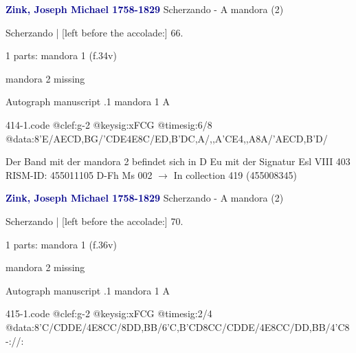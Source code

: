 \documentclass[twocolumn]{book}
\begin{document}
\newline \par \vspace{7pt} \textcolor{darkblue}{\textbf{Zink, Joseph Michael  1758-1829}}
\newline Scherzando - A
\newline mandora (2)
\newline \begin{itshape}[f.34v, at left:] Scherzando | [left before the accolade:] 66.\end{itshape} 
\newline \textcolor{darkblue}{}  1 parts: mandora 1  (f.34v)
\newline \begin{small} mandora 2 missing\end{small} 
\newline Autograph manuscript
.1  mandora 1  A  
\begin{filecontents*}{414-1.code}
@clef:g-2
@keysig:xFCG
@timesig:6/8
@data:8'E/AECD,BG/'CDE4E8C/ED,B'DC,A/,,A'CE4,,A8A/'AECD,B'D/
\end{filecontents*}
\newline
%

\newline Der Band mit der mandora 2 befindet sich in D Eu mit der Signatur Esl VIII 403
\newline RISM-ID: 455011105
\newline D-Fh  Ms 002
\newline $\rightarrow$ In collection 419 (455008345)
      
\newline \par \vspace{7pt} \textcolor{darkblue}{\textbf{Zink, Joseph Michael  1758-1829}}
\newline Scherzando - A
\newline mandora (2)
\newline \begin{itshape}[f.36v, at left:] Scherzando | [left before the accolade:] 70.\end{itshape} 
\newline \textcolor{darkblue}{}  1 parts: mandora 1  (f.36v)
\newline \begin{small} mandora 2 missing\end{small} 
\newline Autograph manuscript
.1  mandora 1  A  
\begin{filecontents*}{415-1.code}
@clef:g-2
@keysig:xFCG
@timesig:2/4
@data:8'C/CDDE/4E{8CC}/8DD,BB/{6'C,B'CD}{8CC}/CDDE/4E{8CC}/DD,BB/4'C8-://:
\end{filecontents*}
\newline
%
\end{document}
